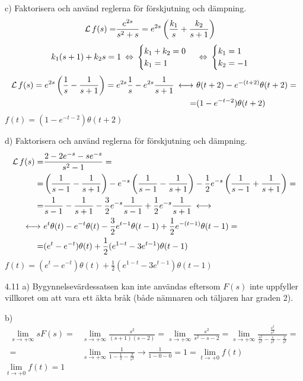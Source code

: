 \begin{task}{c)}
	Faktorisera och använd reglerna för förskjutning och dämpning.
	\begin{align*}
	\operatorname{\mathcal{L}} f(s)=
	&\frac{e^{2s}}{s^2+s}=
	e^{2s}\left(\frac{k_1}{s}+\frac{k_2}{s+1}\right)
	\end{align*}
	\[k_1(s+1)+k_2s=1\lra
	\begin{cases}
	k_1+k_2=0 \\
	k_1=1
	\end{cases}\lra
	\begin{cases}
	k_1=1 \\
	k_2=-1
	\end{cases}\]
	\begin{align*}
	\laplace f(s)=
	e^{2s}\left(\frac{1}{s}-\frac{1}{s+1}\right)=
	e^{2s}\frac{1}{s}-e^{2s}\frac{1}{s+1} \llra
	&\theta(t+2)-e^{-(t+2)}\theta(t+2)= \\ =
	&(1-e^{-t-2})\theta(t+2)
	\end{align*}
	\ans $f(t)=(1-e^{-t-2})\theta(t+2)$
\end{task}

\begin{task}{d)}
	Faktorisera och använd reglerna för förskjutning och dämpning.
	\begin{align*}
	\laplace f(s)=
	&\frac{2-2e^{-s}-se^{-s}}{s^2-1}= \\ =
	&\left(\frac{1}{s-1}-\frac{1}{s+1}\right)-e^{-s}\left(\frac{1}{s-1}-\frac{1}{s+1}\right)-\frac{1}{2}e^{-s}\left(\frac{1}{s-1}+\frac{1}{s+1}\right)= \\ =
	&\frac{1}{s-1}-\frac{1}{s+1}-\frac{3}{2}e^{-s}\frac{1}{s-1}+\frac{1}{2}e^{-s}\frac{1}{s+1} \llra \\ \llra
	&e^{t}\theta(t)-e^{-t}\theta(t)-\frac{3}{2}e^{t-1}\theta(t-1)+\frac{1}{2}e^{-(t-1)}\theta(t-1)= \\ =
	&(e^{t}-e^{-t})\theta(t)+\frac{1}{2}(e^{1-t}-3e^{t-1})\theta(t-1)
	\end{align*}
	\ans $f(t)=(e^{t}-e^{-t})\theta(t)+\frac{1}{2}(e^{1-t}-3e^{t-1})\theta(t-1)$
\end{task}

\begin{task}{4.11 a)}
	Bygynnelsevärdessatsen kan inte användas eftersom $F(s)$ inte uppfyller villkoret om att vara ett äkta bråk (både nämnaren och täljaren har graden 2).
\end{task}

\begin{task}{b)}
	\begin{align*}
	\lim\limits_{s\rightarrow +\infty}sF(s)=
	&\lim\limits_{s\rightarrow +\infty}\frac{s^2}{(s+1)(s-2)}=
	\lim\limits_{s\rightarrow +\infty}\frac{s^2}{s^2-s-2}=
	\lim\limits_{s\rightarrow +\infty}\frac{\frac{s^2}{s^2}}{\frac{s^2}{s^2}-\frac{s}{s^2}-\frac{2}{s^2}}= \\ =
	&\lim\limits_{s\rightarrow +\infty}\frac{1}{1-\frac{1}{s}-\frac{2}{s^2}}\rightarrow
	\frac{1}{1-0-0}=
	1=\lim\limits_{t\rightarrow +0}f(t)
	\end{align*}
	\ans $\lim\limits_{t\rightarrow +0}f(t)=1$
\end{task}

